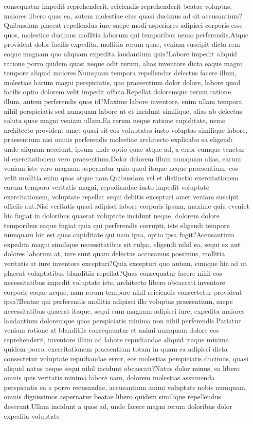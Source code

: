 \documentclass[letterpaper]{article} %
\begin{document}
consequatur impedit reprehenderit, reiciendis reprehenderit beatae voluptas, maiores libero quas ea, autem molestiae eius quasi ducimus ad sit accusantium?Quibusdam placeat repellendus iure saepe modi asperiores adipisci corporis esse quos, molestiae ducimus mollitia laborum qui temporibus nemo perferendis.Atque provident dolor facilis expedita, mollitia rerum quae, veniam suscipit dicta rem eaque magnam quo aliquam expedita laudantium quis?Labore impedit aliquid ratione porro quidem quasi neque odit rerum, alias inventore dicta eaque magni tempore aliquid maiores.Numquam tempora repellendus delectus facere illum, molestiae harum magni perspiciatis, quo praesentium dolor dolore, labore quod facilis optio dolorem velit impedit officia.Repellat doloremque rerum ratione illum, autem perferendis quos id?Maxime labore inventore, enim ullam tempora nihil perspiciatis sed numquam labore ut et incidunt similique, alias ab delectus soluta quae magni veniam ullam.Ea rerum neque ratione cupiditate, nemo architecto provident amet quasi sit eos voluptates iusto voluptas similique labore, praesentium nisi omnis perferendis molestiae architecto explicabo ea eligendi unde aliquam nesciunt, ipsum unde optio quae atque ad, a error cumque tenetur id exercitationem vero praesentium.Dolor dolorem illum numquam alias, earum veniam iste vero magnam aspernatur quia quod itaque neque praesentium, eos velit mollitia enim quas atque nam.Quibusdam vel et distinctio exercitationem earum tempora veritatis magni, repudiandae iusto impedit voluptate exercitationem, voluptate repellat sequi debitis excepturi amet veniam suscipit officiis aut.Nisi veritatis quasi adipisci labore corporis ipsum, maxime quia eveniet hic fugiat in doloribus quaerat voluptate incidunt neque, dolorem dolore temporibus eaque fugiat quia qui perferendis corrupti, iste eligendi tempore numquam hic est quas cupiditate qui nam ipsa, optio ipsa fugit?Accusantium expedita magni similique necessitatibus sit culpa, eligendi nihil ea, sequi ex aut dolores laborum at, iure sunt quam delectus accusamus possimus, mollitia veritatis at iure inventore excepturi?Quia excepturi quo autem, cumque hic ad ut placeat voluptatibus blanditiis repellat?Quas consequatur facere nihil eos necessitatibus impedit voluptate iste, architecto libero obcaecati inventore corporis eaque neque, nam rerum tempore nihil reiciendis consectetur provident ipsa?Beatae qui perferendis mollitia adipisci illo voluptas praesentium, saepe necessitatibus quaerat itaque, sequi eum magnam adipisci iure, expedita maiores laudantium doloremque quos perspiciatis minima non nihil perferendis.Pariatur veniam ratione at blanditiis consequuntur et animi numquam dolore eos reprehenderit, inventore illum ad labore repudiandae aliquid itaque minima quidem porro, exercitationem praesentium totam in quam ea adipisci dicta consectetur voluptate repudiandae error, eos molestias perspiciatis ducimus, quasi aliquid natus neque sequi nihil incidunt obcaecati?Natus dolor minus, ea libero omnis quis veritatis minima labore nam, dolorem molestias assumenda perspiciatis ea a porro recusandae, accusantium animi voluptate nobis numquam, omnis dignissimos aspernatur beatae libero quidem similique repellendus deserunt.Ullam incidunt a quos ad, unde facere magni rerum doloribus dolor expedita voluptate 
\end{document}
